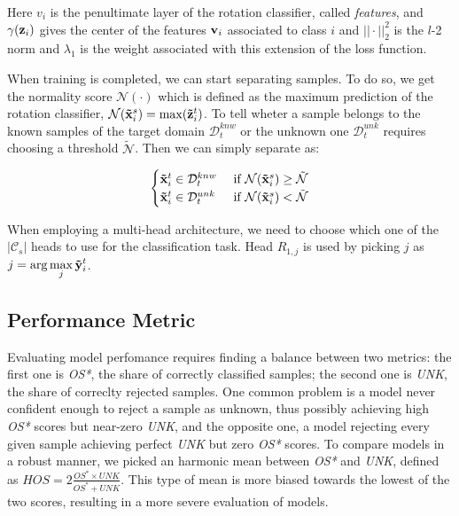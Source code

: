 \documentclass[10pt,twocolumn,letterpaper]{article}
\begin{document}
Here {\bf $v_i$} is the penultimate layer of the rotation classifier, called {\it features}, and $\gamma({\bf z}_i)$ gives the center of the features ${\bf v}_i$ associated to class $i$ and $||\cdot||_2^2$ is the $l$-2 norm and $\lambda_1$ is the weight associated with this extension of the loss function.

When training is completed, we can start separating samples.
To do so, we get the normality score $\mathcal{N}(\cdot)$ which is defined as the maximum prediction of the rotation classifier, $\mathcal{N}({\bf\tilde{x}}_i^s) = \max({\bf\tilde{z}}_i^t)$.
To tell wheter a sample belongs to the known samples of the target domain $\mathcal{D}_t^{knw}$ or the unknown one $\mathcal{D}_t^{unk}$ requires choosing a threshold $\tilde{\mathcal{N}}$.
Then we can simply separate as:

\begin{equation}
  \begin{cases}
    {\bf\tilde x}_i^t \in \mathcal{D}_t^{knw} & \text{ if } \mathcal{N}({\bf\tilde x}_i^s) \geq \tilde{\mathcal{N}} \\
    {\bf\tilde x}_i^t \in \mathcal{D}_t^{unk} & \text{ if } \mathcal{N}({\bf\tilde x}_i^s) < \tilde{\mathcal{N}}
  \end{cases}
\end{equation}
\label{eq:sample_separation}

When employing a multi-head architecture, we need to choose which one of the $|\mathcal{C}_s|$ heads to use for the classification task.
Head $R_{1,j}$ is used by picking $j$ as $\displaystyle j = \arg\max_j {\bf\tilde{y}}_i^t$.

\subsection{Performance Metric}
\label{sec:performance_metric}

Evaluating model perfomance requires finding a balance between two metrics:
the first one is {\it OS*}, the share of correctly classified samples;
the second one is {\it UNK}, the share of correclty rejected samples.
One common problem is a model never confident enough to reject a sample as unknown, thus possibly achieving high {\it OS*} scores but near-zero {\it UNK}, and the opposite one, a model rejecting every given sample achieving perfect {\it UNK} but zero {\it OS*} scores.
To compare models in a robust manner, we picked an harmonic mean between {\it OS*} and {\it UNK}, defined as $HOS = 2\frac{OS^*\times UNK}{OS^*+UNK}$.
This type of mean is more biased towards the lowest of the two scores, resulting in a more severe evaluation of models.
\end{document}

